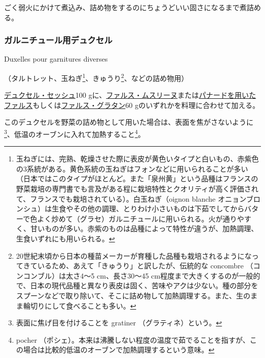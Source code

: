 \begin{recette}
ごく弱火にかけて煮込み、詰め物をするのにちょうどいい固さになるまで煮詰める。

\atoaki{}

\hypertarget{duxelles-pour-farnitures-diverses}{%
\subsubsection{ガルニチュール用デュクセル}\label{duxelles-pour-farnitures-diverses}}

\begin{frsubenv}

Duxelles pour garnitures diverses

\end{frsubenv}


（タルトレット、玉ねぎ\footnote{玉ねぎには、完熟、乾燥させた際に表皮が黄色いタイプと白いもの、赤紫色の3系統がある。黄色系統の玉ねぎはフォンなどに用いられることが多い（日本ではこのタイプがほとんど。また「泉州黄」という品種はフランスの野菜栽培の専門書でも言及がある程に栽培特性とクオリティが高く評価されて、フランスでも栽培されている）。白玉ねぎ（oignon
  blanche
  オニョンブロンシュ）は生食やその他の調理、とりわけ小さいものは下茹でしてからバターで色よく炒めて（グラセ）ガルニチュールに用いられる。火が通りやすく、甘いものが多い。赤紫のものは品種によって特性が違うが、加熱調理、生食いずれにも用いられる。}、きゅうり\footnote{20世紀末頃から日本の種苗メーカーが育種した品種も栽培されるようになってきているため、あえて「きゅうり」と訳したが、伝統的な
  concombre （コンコンブル）は太さ4〜5 cm、長さ30〜45
  cm程度まで大きくするのが一般的で、日本の現代品種と異なり表皮は固く、苦味やアクは少ない。種の部分をスプーンなどで取り除いて、そこに詰め物して加熱調理する。また、生のまま輪切りにして食べることも多い。}、などの詰め物用）

\protect\hyperlink{duxelles-seche}{デュクセル・セッシュ}100
gに、\protect\hyperlink{farce-c}{ファルス・ムスリーヌ}または\protect\hyperlink{farce-a}{パナードを用いたファルス}もしくは\protect\hyperlink{farce-gratin-a}{ファルス・グラタン}60
gのいずれかを料理に合わせて加える。

このデュクセルを野菜の詰め物として用いた場合は、表面を焦がさないように\footnote{表面に焦げ目を付けることを
  gratiner （グラティネ）という。}、低温のオーブンに入れて加熱すること\footnote{pocher
  （ポシェ）。本来は沸騰しない程度の温度で茹でることを指すが、この場合は比較的低温のオーブンで加熱調理するという意味。}。


\end{recette}
